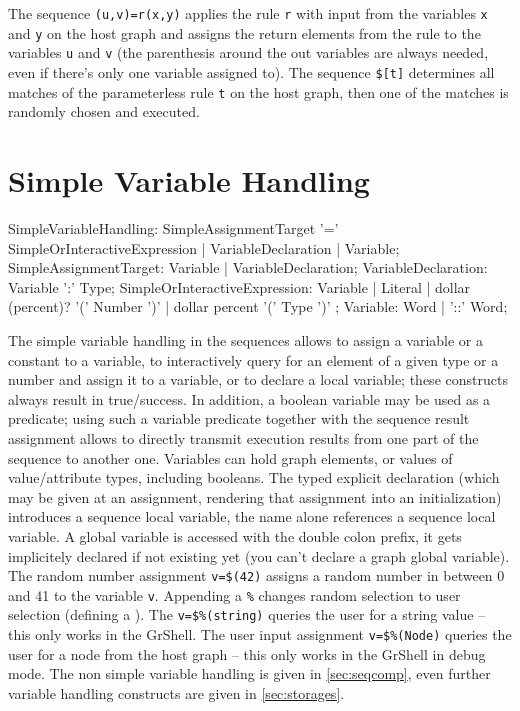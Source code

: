 \begin{example}
The sequence \verb#(u,v)=r(x,y)# applies the rule \texttt{r} with input from the variables \texttt{x} and \texttt{y} on the host graph 
and assigns the return elements from the rule to the variables \texttt{u} and \texttt{v} (the parenthesis around the out variables are always needed, even if there's only one variable assigned to).
The sequence \verb#$[t]# determines all matches of the parameterless rule \texttt{t} on the host graph, then one of the matches is randomly chosen and executed.
\end{example}


\section{Simple Variable Handling}\label{sec:simplevarhandling}

\begin{rail}
  SimpleVariableHandling: SimpleAssignmentTarget '=' SimpleOrInteractiveExpression | VariableDeclaration | Variable;
  SimpleAssignmentTarget: Variable | VariableDeclaration; 
	VariableDeclaration: Variable ':' Type;
	SimpleOrInteractiveExpression:
		Variable |  
		Literal | 
		dollar (percent)? '(' Number ')' |
		dollar percent '(' Type ')'
  ;
  Variable: Word | '::' Word;
\end{rail}\makeatother

The simple variable handling in the sequences allows to assign a variable or a constant to a variable, to interactively query for an element of a given type or a number and assign it to a variable, or to declare a local variable; these constructs always result in true/success.
In addition, a boolean variable may be used as a predicate; using such a variable predicate together with the sequence result assignment allows to directly transmit execution results from one part of the sequence to another one.
Variables can hold graph elements, or values of value/attribute types, including booleans.
The typed explicit declaration (which may be given at an assignment, rendering that assignment into an initialization) introduces a sequence local variable, the name alone references a sequence local variable.
A global variable is accessed with the double colon prefix, it gets implicitely declared if not existing yet (you can't declare a graph global variable).
The random number assignment \texttt{v=\$(42)} assigns a random number in between 0 and 41 to the variable \texttt{v}. 
Appending a \texttt{\%} changes random selection to user selection (defining a ).
The  \texttt{v=\$\%(string)} queries the user for a string value -- this only works in the GrShell.
The user input assignment \texttt{v=\$\%(Node)} queries the user for a node from the host graph -- this only works in the GrShell in debug mode.
The non simple variable handling is given in \ref{sec:seqcomp}, even further variable handling constructs are given in \ref{sec:storages}.


